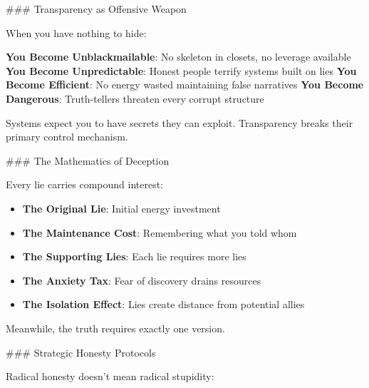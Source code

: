 \documentclass[12pt]{book}
\begin{document}
\#\#\# Transparency as Offensive Weapon

When you have nothing to hide:

\textbf{You Become Unblackmailable}: No skeleton in closets, no leverage available
\textbf{You Become Unpredictable}: Honest people terrify systems built on lies
\textbf{You Become Efficient}: No energy wasted maintaining false narratives
\textbf{You Become Dangerous}: Truth-tellers threaten every corrupt structure

Systems expect you to have secrets they can exploit. Transparency breaks their primary control mechanism.

\#\#\# The Mathematics of Deception

Every lie carries compound interest:

\begin{itemize}
\item \textbf{The Original Lie}: Initial energy investment
\item \textbf{The Maintenance Cost}: Remembering what you told whom
\item \textbf{The Supporting Lies}: Each lie requires more lies
\item \textbf{The Anxiety Tax}: Fear of discovery drains resources
\item \textbf{The Isolation Effect}: Lies create distance from potential allies

\end{itemize}
Meanwhile, the truth requires exactly one version.

\#\#\# Strategic Honesty Protocols

Radical honesty doesn't mean radical stupidity:
\end{document}

